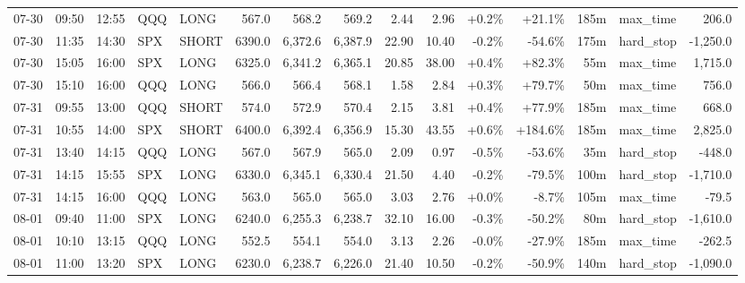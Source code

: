 \documentclass[11pt,a4paper,twoside]{article}
\begin{document}
\begin{landscape}
\begin{center}
\begin{longtable}{>{\color{txtmain}}l l l l l r r r r r r r r >{\color{txtmain}}l r}
07-30 & 09:50 & 12:55 & QQQ & LONG & 567.0 & 568.2 & 569.2 & 2.44 & 2.96 & \textcolor{wingreen}{+0.2\%} & \textcolor{wingreen}{+21.1\%} & 185m & max\_time & \textcolor{wingreen}{206.0} \\
07-30 & 11:35 & 14:30 & SPX & SHORT & 6390.0 & 6,372.6 & 6,387.9 & 22.90 & 10.40 & \textcolor{lossred}{-0.2\%} & \textcolor{lossred}{-54.6\%} & 175m & hard\_stop & \textcolor{lossred}{-1,250.0} \\
07-30 & 15:05 & 16:00 & SPX & LONG & 6325.0 & 6,341.2 & 6,365.1 & 20.85 & 38.00 & \textcolor{wingreen}{+0.4\%} & \textcolor{wingreen}{+82.3\%} & 55m & max\_time & \textcolor{wingreen}{1,715.0} \\
07-30 & 15:10 & 16:00 & QQQ & LONG & 566.0 & 566.4 & 568.1 & 1.58 & 2.84 & \textcolor{wingreen}{+0.3\%} & \textcolor{wingreen}{+79.7\%} & 50m & max\_time & \textcolor{wingreen}{756.0} \\
07-31 & 09:55 & 13:00 & QQQ & SHORT & 574.0 & 572.9 & 570.4 & 2.15 & 3.81 & \textcolor{wingreen}{+0.4\%} & \textcolor{wingreen}{+77.9\%} & 185m & max\_time & \textcolor{wingreen}{668.0} \\
07-31 & 10:55 & 14:00 & SPX & SHORT & 6400.0 & 6,392.4 & 6,356.9 & 15.30 & 43.55 & \textcolor{wingreen}{+0.6\%} & \textcolor{wingreen}{+184.6\%} & 185m & max\_time & \textcolor{wingreen}{2,825.0} \\
07-31 & 13:40 & 14:15 & QQQ & LONG & 567.0 & 567.9 & 565.0 & 2.09 & 0.97 & \textcolor{lossred}{-0.5\%} & \textcolor{lossred}{-53.6\%} & 35m & hard\_stop & \textcolor{lossred}{-448.0} \\
07-31 & 14:15 & 15:55 & SPX & LONG & 6330.0 & 6,345.1 & 6,330.4 & 21.50 & 4.40 & \textcolor{lossred}{-0.2\%} & \textcolor{lossred}{-79.5\%} & 100m & hard\_stop & \textcolor{lossred}{-1,710.0} \\
07-31 & 14:15 & 16:00 & QQQ & LONG & 563.0 & 565.0 & 565.0 & 3.03 & 2.76 & \textcolor{wingreen}{+0.0\%} & \textcolor{lossred}{-8.7\%} & 105m & max\_time & \textcolor{lossred}{-79.5} \\
08-01 & 09:40 & 11:00 & SPX & LONG & 6240.0 & 6,255.3 & 6,238.7 & 32.10 & 16.00 & \textcolor{lossred}{-0.3\%} & \textcolor{lossred}{-50.2\%} & 80m & hard\_stop & \textcolor{lossred}{-1,610.0} \\
08-01 & 10:10 & 13:15 & QQQ & LONG & 552.5 & 554.1 & 554.0 & 3.13 & 2.26 & \textcolor{lossred}{-0.0\%} & \textcolor{lossred}{-27.9\%} & 185m & max\_time & \textcolor{lossred}{-262.5} \\
08-01 & 11:00 & 13:20 & SPX & LONG & 6230.0 & 6,238.7 & 6,226.0 & 21.40 & 10.50 & \textcolor{lossred}{-0.2\%} & \textcolor{lossred}{-50.9\%} & 140m & hard\_stop & \textcolor{lossred}{-1,090.0} \\

\end{longtable}
\end{center}
\end{landscape}
\end{document}
